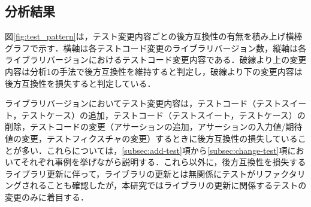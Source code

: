 \documentclass[submit]{ipsj}
\begin{document}
\subsection{分析結果}

図\ref{fig:test_pattern}は，テスト変更内容ごとの後方互換性の有無を積み上げ横棒グラフで示す．横軸は各テストコード変更のライブラリバージョン数，縦軸は各ライブラリバージョンにおけるテストコード変更内容である．破線より上の変更内容は分析1の手法で後方互換性を維持すると判定し，破線より下の変更内容は後方互換性を損失すると判定している．

ライブラリバージョンにおいてテスト変更内容は，テストコード（テストスイート，テストケース）の追加，テストコード（テストスイート，テストケース）の削除，テストコードの変更（アサーションの追加，アサーションの入力値/期待値の変更，テストフィクスチャの変更）するときに後方互換性の損失していることが多い．これらについては，\ref{subsec:add-test}項から\ref{subsec:change-test}項においてそれぞれ事例を挙げながら説明する．これら以外に，後方互換性を損失するライブラリ更新に伴って，ライブラリの更新とは無関係にテストがリファクタリングされることも確認したが，本研究ではライブラリの更新に関係するテストの変更のみに着目する．

\end{document}
